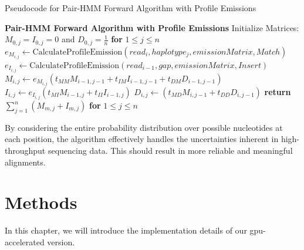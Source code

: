 \documentclass[PhD]{PHlab-thesis}
\begin{document}
\begin{algorithm}
\caption{Pseudocode for Pair-HMM Forward Algorithm with Profile Emissions}
\begin{algorithmic}[1]
\Procedure\textbf{Pair-HMM Forward Algorithm with Profile Emissions}
\State Initialize Matrices: $M_{0,j} = I_{0,j} = 0$ and $D_{0,j} = \frac{1}{n}$ \textbf{for} $1 \leq j \leq n$
        \State $e_{M_{i,j}} \gets \text{CalculateProfileEmission}(read_{i}, haplotype_{j}, emissionMatrix, Match)$
        \State $e_{I_{i,j}} \gets \text{CalculateProfileEmission}(read_{i-1}, gap, emissionMatrix, Insert)$
        \State $M_{i,j} \gets e_{M_{i,j}} (t_{MM} M_{i-1,j-1}  + t_{IM} I_{i-1,j-1}  +  t_{DM} D_{i-1,j-1})$
        \State $I_{i,j} \gets e_{I_{i,j}} (t_{MI} M_{i-1,j}  + t_{II} I_{i-1,j} )$
        \State $D_{i,j} \gets (t_{MD} M_{i,j-1} + t_{DD} D_{i,j-1} )$
    \EndFor
\EndFor
\State \textbf{return }$\sum_{j=1}^{n} (M_{m,j} + I_{m,j})$ \textbf{for} $1 \leq j \leq n$
\EndProcedure
\end{algorithmic}
\end{algorithm}
\vspace{0.5cm} %
\newline
By considering the entire probability distribution over possible nucleotides at each position, the algorithm effectively handles the uncertainties inherent in high-throughput sequencing data. This should result in more reliable and meaningful alignments.

\chapter{Methods}
In this chapter, we will introduce the implementation details of our gpu-accelerated version.
\end{document}
